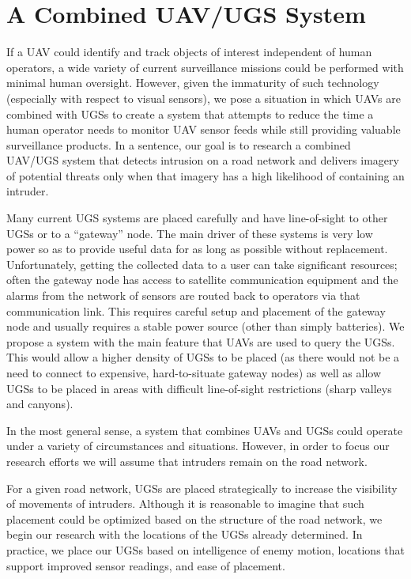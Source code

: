 \documentclass[letterpaper, 12 pt, conference]{ieeeconf}  %
\theoremstyle{definition}
\begin{document}
\section{A Combined UAV/UGS System\label{sec:UGS}}
If a UAV could identify and track objects of
interest independent of human operators, a wide variety of current surveillance missions
could be performed with minimal human oversight. However, given the immaturity
of such technology (especially with respect to visual sensors), we pose a
situation in which UAVs are combined with UGSs to create a system that attempts
to reduce the time a human operator needs to monitor UAV sensor feeds while
still providing valuable surveillance products. In a sentence, our goal is to research a
combined UAV/UGS system that detects intrusion on a road network and delivers
imagery of potential threats only when that imagery has a high likelihood of
containing an intruder.

Many current UGS systems are placed carefully and have line-of-sight to other
UGSs or to a ``gateway'' node. The main driver of these systems is very low
power so as to provide useful data for as long as possible without replacement.
Unfortunately, getting the collected data to a user can take
significant resources; often the gateway node has access to satellite
communication equipment and the alarms from the network of sensors
are routed back to operators via that communication link. This requires careful
setup and placement of the gateway node and usually requires a stable power
source (other than simply batteries). We propose a system with the main feature
that UAVs are used to query the UGSs. This would allow a higher density of UGSs
to be placed (as there would not be a need to connect to expensive,
hard-to-situate gateway nodes) as well as allow UGSs to be placed in areas with
difficult line-of-sight restrictions (sharp valleys and canyons).

In the most general sense, a system that combines UAVs and UGSs could operate
under a variety of circumstances and situations. However, in order to focus our
research efforts we will assume that intruders remain on the road network.

For a given road network, UGSs are placed strategically to increase the visibility of
movements of intruders. Although it is reasonable to imagine that such placement could
be optimized based on the structure of the road network, we begin our research with
the locations of the UGSs already determined. In practice, we place our UGSs based
on intelligence of enemy motion, locations that support improved sensor readings,
and ease of placement.
\end{document}
